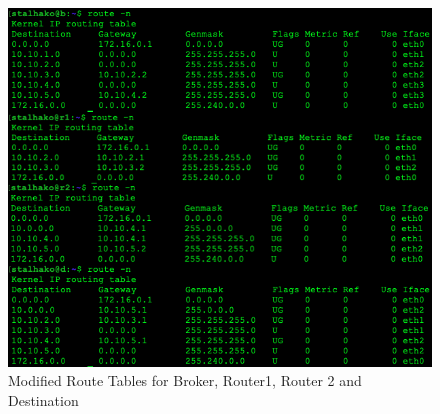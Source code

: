 \begin{figure}[ht]
   \centering
   \includegraphics[scale=.40]{images/VM_after.png}
    \caption{Modified Route Tables for Broker, Router1, Router 2 and Destination}
    \label{fig:topology}
\end{figure}